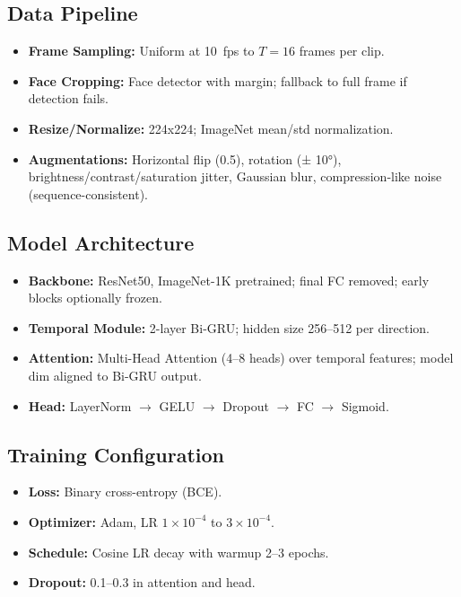 \subsection{Data Pipeline}
\begin{itemize}
    \item \textbf{Frame Sampling:} Uniform at 10~fps to $T=16$ frames per clip.
    \item \textbf{Face Cropping:} Face detector with margin; fallback to full frame if detection fails.
    \item \textbf{Resize/Normalize:} 224x224; ImageNet mean/std normalization.
    \item \textbf{Augmentations:} Horizontal flip (0.5), rotation (± 10°), brightness/contrast/saturation jitter, Gaussian blur, compression-like noise (sequence-consistent).
\end{itemize}

\subsection{Model Architecture}
\begin{itemize}
    \item \textbf{Backbone:} ResNet50, ImageNet-1K pretrained; final FC removed; early blocks optionally frozen.
    \item \textbf{Temporal Module:} 2-layer Bi-GRU; hidden size 256--512 per direction.
    \item \textbf{Attention:} Multi-Head Attention (4--8 heads) over temporal features; model dim aligned to Bi-GRU output.
    \item \textbf{Head:} LayerNorm $\rightarrow$ GELU $\rightarrow$ Dropout $\rightarrow$ FC $\rightarrow$ Sigmoid.
\end{itemize}

\subsection{Training Configuration}
\begin{itemize}
    \item \textbf{Loss:} Binary cross-entropy (BCE).
    \item \textbf{Optimizer:} Adam, LR $1\times 10^{-4}$ to $3\times 10^{-4}$.
    \item \textbf{Schedule:} Cosine LR decay with warmup 2--3 epochs.
    \item \textbf{Dropout:} 0.1--0.3 in attention and head.
\end{itemize}

